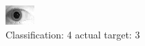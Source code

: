 \begin{figure}[h!]
\begin{center}
\includegraphics[width=0.60\columnwidth]{figures/ID1976_class_4_target_3.png}
\end{center}
\caption{ Classification: 4 actual target: 3}
\label{fig:ID1976_class_4_target_3}
\end{figure}
